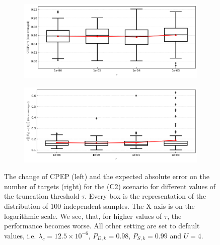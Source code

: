 \begin{figure}
    \centering
    \begin{subfigure}[]{0.48\linewidth}
        \centering
        \includegraphics[width=\linewidth]{figures/c2-tau-cpep.png}
    \end{subfigure}
    \hfill
    \begin{subfigure}[]{0.48\linewidth}
        \centering
        \includegraphics[width=\linewidth]{figures/c2-tau-eae.png}
    \end{subfigure}
  \caption[(C2). Change of performance depending on the prune threshold.]{The change of CPEP (left) and the expected absolute error on the number of targets (right) for the (C2) scenario for different values of the truncation threshold $\tau$. Every box is the representation of the distribution of $100$ independent samples. The X axis is on the logarithmic scale. We see, that, for higher values of $\tau$, the performance becomes worse. All other setting are set to default values, i.e. $\lambda_{c} = 12.5 \times 10^{-6}$, $P_{D,k} = 0.98$, $P_{S,k} = 0.99$ and $U = 4$.}
  \label{fig:c2-tau}
\end{figure}

